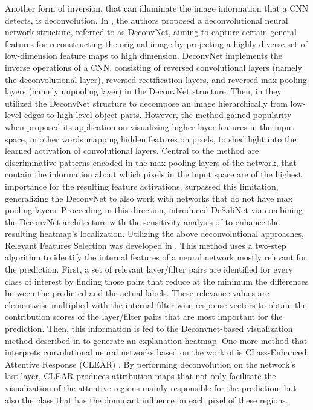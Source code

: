 \documentclass[journal]{IEEEtran}
\begin{document}
Another form of inversion, that can illuminate the image information that a CNN detects, is deconvolution.
In \cite{Zeiler2010}, the authors proposed a deconvolutional neural network structure, referred to as DeconvNet, aiming to capture certain general features for reconstructing the original image by projecting a highly diverse set of low-dimension feature maps to high dimension. DeconvNet implements the inverse operations of a CNN, consisting of reversed convolutional layers (namely the deconvolutional layer), reversed rectification layers, and reversed max-pooling layers (namely unpooling layer) in the DeconvNet structure. 
Then, in \cite{Zeiler2011} they utilized the DeconvNet structure to decompose an image hierarchically from low-level edges to high-level object parts.
However, the method gained popularity when \cite{Zeiler2014} proposed its application on visualizing higher layer features in the input space, in other words mapping hidden features on pixels, to shed light into the learned activation of convolutional layers. 
Central to the \cite{Zeiler2014} method are discriminative patterns encoded in the max pooling layers of the network, that contain the information about which pixels in the input space are of the highest importance for the resulting feature activations. \cite{Springenberg2015} surpassed this limitation, generalizing the DeconvNet to also work with networks that do not have max pooling layers.
Proceeding in this direction, \cite{Mahendran2016a} introduced DeSaliNet via combining the DeconvNet architecture with the sensitivity analysis of \cite{Simonyan2014} to enhance the resulting heatmap's localization.
Utilizing the above deconvolutional approaches, Relevant Features Selection was developed in \cite{JoseOramas2017}. This method uses a two-step algorithm to identify the internal features of a neural network mostly relevant for the prediction. First, a set of relevant layer/filter pairs are identified for every class of interest by finding those pairs that reduce at the minimum the differences between the predicted and the actual labels. These relevance values are elementwise multiplied with the internal filter-wise response vectors to obtain the contribution scores of the layer/filter pairs that are most important for the prediction. Then, this information is fed to the Deconvnet-based visualization method described in \cite{Grun2016} to generate an explanation heatmap.
One more method that interprets convolutional neural networks based on the work of \cite{Zeiler2010} is CLass-Enhanced Attentive Response (CLEAR) \cite{Kumar2017}. By performing deconvolution on the network's last layer, CLEAR produces attribution maps that not only facilitate the visualization of the attentive regions mainly responsible for the prediction, but also the class that has the dominant influence on each pixel of these regions.
\end{document}
